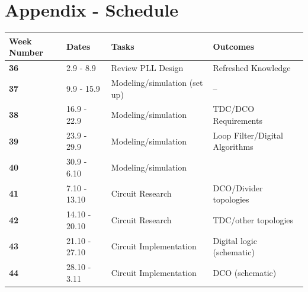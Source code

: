 \documentclass[10pt,a4paper]{article}
\begin{document}
	\pagebreak
	\appendix

	\section{Appendix - Schedule}
	\begin{table}
		\footnotesize
		\def\arraystretch{1.5}		
		\setlength\arrayrulewidth{0.75pt}
		\setlength{\tabcolsep}{1em} %
		\begin{tabular}{|l|l|l|l|}
			\hline 
			\rule[-1ex]{0pt}{2.5ex} \cellcolor{gray!40}\textbf{Week Number} & \cellcolor{gray!40}\textbf{Dates} &\cellcolor{gray!40}\textbf{Tasks} & \cellcolor{gray!40}\textbf{Outcomes}\\ 
			\hline 
			\rule[-1ex]{0pt}{2.5ex} \cellcolor{red!20}\textbf{36}& \cellcolor{red!20}2.9 - 8.9 & \cellcolor{red!20}Review PLL Design & \cellcolor{red!20}Refreshed Knowledge\\ 
			\hline 
			\rule[-1ex]{0pt}{2.5ex} \cellcolor{red!20}\textbf{37}& \cellcolor{red!20}9.9 - 15.9 & \cellcolor{red!20}Modeling/simulation (set up) & \cellcolor{red!20}--\\ 
			\hline 
			\rule[-1ex]{0pt}{2.5ex} \cellcolor{red!20}\textbf{38}& \cellcolor{red!20}16.9 - 22.9 & \cellcolor{red!20}Modeling/simulation &\cellcolor{red!20} TDC/DCO Requirements\\ 
			\hline 
			\rule[-1ex]{0pt}{2.5ex} \cellcolor{green!20}\textbf{39}& \cellcolor{green!20}23.9 - 29.9& \cellcolor{green!20}Modeling/simulation& \cellcolor{green!20}Loop Filter/Digital Algorithms\\ 
			\hline 
			\rule[-1ex]{0pt}{2.5ex} \cellcolor{blue!20}\textbf{40}& \cellcolor{blue!20}30.9 - 6.10& \cellcolor{blue!20}Modeling/simulation& \cellcolor{blue!20}\color{red}{\textbf{Loop filter,}} \color{black}{Ideal implementation in Cadence}\\ 
			\hline 
			\rule[-1ex]{0pt}{2.5ex} \textbf{41}& 7.10 - 13.10& Circuit Research & DCO/Divider topologies\\ 
			\hline 
			\rule[-1ex]{0pt}{2.5ex} \textbf{42}& 14.10 - 20.10& Circuit Research & TDC/other topologies\\ 
			\hline 
			\rule[-1ex]{0pt}{2.5ex} \textbf{43}& 21.10 - 27.10& Circuit Implementation& Digital logic (schematic)\\ 
			\hline 
			\rule[-1ex]{0pt}{2.5ex} \textbf{44}& 28.10 - 3.11& Circuit Implementation& DCO (schematic)\\ 

\end{tabular}
\end{table}
\end{document}
